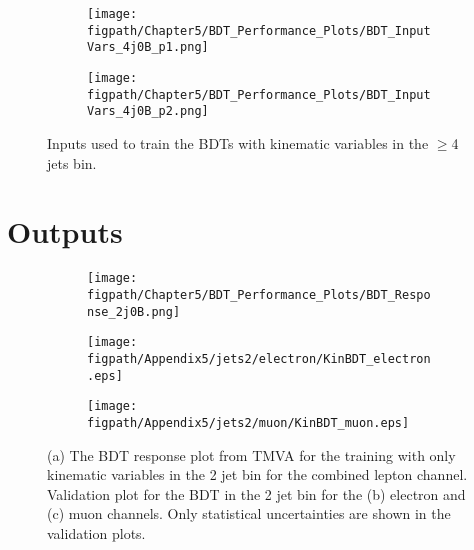 \begin{figure}[!hbt]
    \centering
    \begin{subfigure}[t]{0.95\textwidth}
        \texttt{[image: \\figpath/Chapter5/BDT\_Performance\_Plots/BDT\_InputVars\_4j0B\_p1.png]}
        \caption{}
        \label{fig:BDT_InputVars_4j0B_p1}
    \end{subfigure}

    \begin{subfigure}[t]{0.95\textwidth}
        \texttt{[image: \\figpath/Chapter5/BDT\_Performance\_Plots/BDT\_InputVars\_4j0B\_p2.png]}
        \caption{}
        \label{fig:BDT_InputVars_4j0B_p2}
    \end{subfigure}
    \caption{Inputs used to train the BDTs with kinematic variables in the $\geqslant$4 jets bin.}
    \label{fig:BDT_InputVars_4j0B}
\end{figure}
\clearpage
















\section{Outputs}
\label{appendix:BDT_Outputs}
\begin{figure}[!hbt]
    \centering
    \begin{subfigure}[t]{0.317\textwidth}
        \texttt{[image: \\figpath/Chapter5/BDT\_Performance\_Plots/BDT\_Response\_2j0B.png]}
        \caption{}
        \label{fig:BDT_Response_2j0B_TMVA}
    \end{subfigure}
    \begin{subfigure}[t]{0.317\textwidth}
        \texttt{[image: \\figpath/Appendix5/jets2/electron/KinBDT\_electron.eps]}
        \caption{}
        \label{fig:KinBDT_jets2_electron_noSys}
    \end{subfigure}
    \begin{subfigure}[t]{0.317\textwidth}
        \texttt{[image: \\figpath/Appendix5/jets2/muon/KinBDT\_muon.eps]}
        \caption{}
        \label{fig:KinBDT_jets2_muon_noSys}
    \end{subfigure}
    \caption{(a) The BDT response plot from TMVA for the training with only kinematic variables in the 2 jet bin for the combined lepton channel. Validation plot for the BDT in the 2 jet bin for the (b) electron and (c) muon channels. Only statistical uncertainties are shown in the validation plots.}
    \label{fig:KinBDT_Comparison_jets2}
\end{figure}

